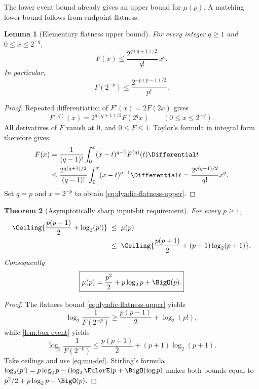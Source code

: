 \documentclass[11pt,oneside]{article}
\newtheorem{theorem}{Theorem}[section]
\newtheorem{lemma}[theorem]{Lemma}
\theoremstyle{definition}
\theoremstyle{remark}
\numberwithin{equation}{section}
\begin{document}
The lower event bound already gives an upper bound for $\mu(p)$.  A matching
lower bound follows from endpoint flatness.

\begin{lemma}[Elementary flatness upper bound]\label{lem:flatness-upper}
For every integer $q\ge1$ and $0\le x\le2^{-q}$,
\begin{equation}\label{eq:flatness-upper}
 F(x)\le\frac{2^{q(q+1)/2}}{q!}\,x^q.
\end{equation}
In particular,
\begin{equation}\label{eq:dyadic-flatness-upper}
 F(2^{-p})\le\frac{2^{-p(p-1)/2}}{p!}.
\end{equation}
\end{lemma}

\begin{proof}
Repeated differentiation of $F'(x)=2F(2x)$ gives
\begin{equation}\label{eq:iterated-derivative}
 F^{(q)}(x)=2^{q(q+1)/2}F(2^qx)
 \qquad(0\le x\le2^{-q}).
\end{equation}
All derivatives of $F$ vanish at $0$, and $0\le F\le1$.  Taylor's formula in
integral form therefore gives
\begin{align*}
 F(x)
 &=\frac1{(q-1)!}\int_0^x(x-t)^{q-1}F^{(q)}(t)\Differential t\\
 &\le\frac{2^{q(q+1)/2}}{(q-1)!}
      \int_0^x(x-t)^{q-1}\Differential t
 =\frac{2^{q(q+1)/2}}{q!}x^q.
\end{align*}
Set $q=p$ and $x=2^{-p}$ to obtain
\eqref{eq:dyadic-flatness-upper}.
\end{proof}

\begin{theorem}[Asymptotically sharp input-bit requirement]\label{thm:mu-asymptotic}
For every $p\ge1$,
\begin{align}
 \Ceiling{\frac{p(p-1)}2+\log_2(p!)}
 \;&\le\;\mu(p)\label{eq:mu-lower}\\
 &\le\;
 \Ceiling{\frac{p(p+1)}2+(p+1)\log_2(p+1)}.
 \label{eq:mu-upper}
\end{align}
Consequently
\begin{equation}\label{eq:mu-asymptotic}
 \boxed{\displaystyle
 \mu(p)=\frac{p^2}{2}+p\log_2p+\BigO(p).}
\end{equation}
\end{theorem}

\begin{proof}
The flatness bound \eqref{eq:dyadic-flatness-upper} yields
\[
 \log_2\frac1{F(2^{-p})}
 \ge\frac{p(p-1)}2+\log_2(p!),
\]
while \cref{lem:box-event} yields
\[
 \log_2\frac1{F(2^{-p})}
 \le\frac{p(p+1)}2+(p+1)\log_2(p+1).
\]
Take ceilings and use \eqref{eq:mu-def}.  Stirling's formula
$\log_2(p!)=p\log_2p-(\log_2\EulerE)p+\BigO(\log p)$ makes both bounds equal to
$p^2/2+p\log_2p+\BigO(p)$.
\end{proof}
\end{document}
